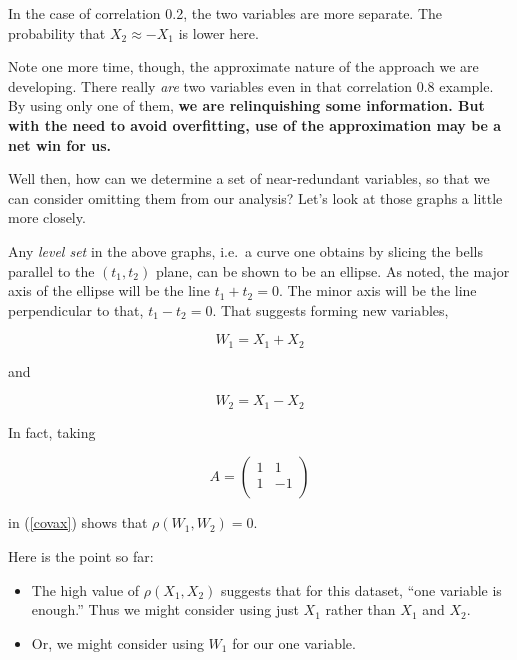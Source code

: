 In the case of correlation 0.2, the two variables are more separate.
The probability that $X_2 \approx -X_1$ is lower here.

Note one more time, though, the approximate nature of the approach we
are developing.  There really \textit{are} two variables even in that
correlation 0.8 example.  By using only one of them, \textbf{we are
relinquishing some information.  But with the need to avoid overfitting,
use of the approximation may be a net win for us.}

Well then, how can we determine a set of near-redundant variables, so
that we can consider omitting them from our analysis?  Let's look at
those graphs a little more closely.

Any \textit{level set} in the above graphs, i.e.\ a curve one
obtains by slicing the bells parallel to the $(t_1,t_2)$ plane, can be
shown to be an ellipse.  As noted, the major axis of the ellipse will be
the line $t_1 + t_2 = 0$.  The minor axis will be the line perpendicular
to that, $t_1 - t_2 = 0$.  That suggests forming new variables,

\begin{equation}
W_1 = X_1 + X_2 
\end{equation}

and 

\begin{equation}
W_2 = X_1 - X_2 
\end{equation}

In fact, taking

\begin{equation}
A = 
\left (
\begin{array}{rr}
1 & 1 \\
1 & -1 \\
\end{array}
\right )
\end{equation}

in (\ref{covax}) shows that $\rho(W_1,W_2) = 0$.

Here is the point so far:

\begin{itemize}

\item The high value of $\rho(X_1,X_2)$ suggests that for this dataset,
``one variable is enough.''  Thus we might consider using just $X_1$
rather than $X_1$ and $X_2$.

\item Or, we might consider using $W_1$ for our one
variable.  

\end{itemize} 

